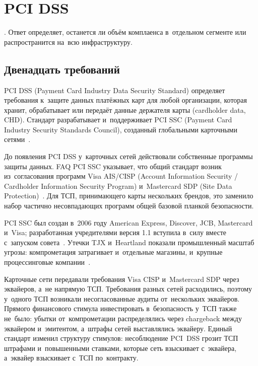 
\chapter{PCI DSS}\label{ch:pci-dss}
.
Ответ определяет, останется ли объём комплаенса в~отдельном сегменте или
распространится на~всю инфраструктуру.

\section{Двенадцать требований}\label{sec:pci-logic}

PCI DSS (Payment Card Industry Data Security Standard) определяет требования
к~защите данных платёжных карт для любой организации, которая хранит,
обрабатывает или передаёт данные держателя карты (cardholder data, CHD).
Стандарт разрабатывает и~поддерживает PCI SSC (Payment Card Industry Security
Standards Council), созданный глобальными карточными сетями~\cite{pci-dss-4}.

До появления PCI DSS у~карточных сетей действовали собственные программы защиты
данных. FAQ PCI SSC указывает, что общий стандарт возник из~согласования
программ Visa AIS/CISP (Account Information Security / Cardholder Information
Security Program) и~Mastercard SDP (Site Data
Protection)~\cite{pci-faq-1199}. Для ТСП, принимающего карты нескольких
брендов, это заменило набор частично несовпадающих программ общей базовой
планкой безопасности.

PCI SSC был создан в~2006 году American Express, Discover, JCB, Mastercard
и~Visa; разработанная учредителями версия 1.1 вступила в~силу вместе с~запуском
совета~\cite{pci-faq-1199,pci-faq-1227}. Утечки TJX и~Heartland показали промышленный
масштаб угрозы: компрометация затрагивает и~отдельные магазины, и~крупные
процессинговые компании~\cite{doj-tjx-2009,doj-heartland-2009}.

Карточные сети передавали требования Visa CISP и~Mastercard SDP через
эквайеров, а~не напрямую ТСП. Требования разных сетей расходились, поэтому
у~одного ТСП возникали несогласованные аудиты от~нескольких эквайеров. Прямого
финансового стимула инвестировать в~безопасность у~ТСП также не~было: убытки
от~компрометации распределялись через chargeback
между эквайером и~эмитентом,
а~штрафы сетей выставлялись эквайеру. Единый стандарт изменил структуру
стимулов: несоблюдение PCI~DSS грозит ТСП штрафами и~повышенными ставками,
которые сеть взыскивает с~эквайера, а~эквайер взыскивает с~ТСП по~контракту.

